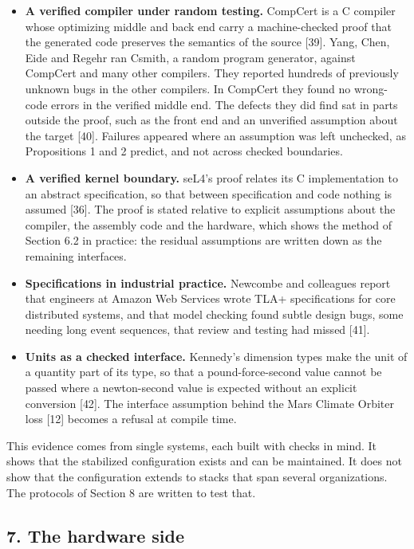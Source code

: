 \documentclass[
  10pt,
]{article}
\providecommand{\tightlist}{%
  \setlength{\itemsep}{0pt}\setlength{\parskip}{0pt}}
\begin{document}
\begin{itemize}
\tightlist
\item
  \textbf{A verified compiler under random testing.} CompCert is a C
  compiler whose optimizing middle and back end carry a machine-checked
  proof that the generated code preserves the semantics of the source
  {[}39{]}. Yang, Chen, Eide and Regehr ran Csmith, a random program
  generator, against CompCert and many other compilers. They reported
  hundreds of previously unknown bugs in the other compilers. In
  CompCert they found no wrong-code errors in the verified middle end.
  The defects they did find sat in parts outside the proof, such as the
  front end and an unverified assumption about the target {[}40{]}.
  Failures appeared where an assumption was left unchecked, as
  Propositions 1 and 2 predict, and not across checked boundaries.
\item
  \textbf{A verified kernel boundary.} seL4's proof relates its C
  implementation to an abstract specification, so that between
  specification and code nothing is assumed {[}36{]}. The proof is
  stated relative to explicit assumptions about the compiler, the
  assembly code and the hardware, which shows the method of Section 6.2
  in practice: the residual assumptions are written down as the
  remaining interfaces.
\item
  \textbf{Specifications in industrial practice.} Newcombe and
  colleagues report that engineers at Amazon Web Services wrote TLA+
  specifications for core distributed systems, and that model checking
  found subtle design bugs, some needing long event sequences, that
  review and testing had missed {[}41{]}.
\item
  \textbf{Units as a checked interface.} Kennedy's dimension types make
  the unit of a quantity part of its type, so that a pound-force-second
  value cannot be passed where a newton-second value is expected without
  an explicit conversion {[}42{]}. The interface assumption behind the
  Mars Climate Orbiter loss {[}12{]} becomes a refusal at compile time.
\end{itemize}

This evidence comes from single systems, each built with checks in mind.
It shows that the stabilized configuration exists and can be maintained.
It does not show that the configuration extends to stacks that span
several organizations. The protocols of Section 8 are written to test
that.

\subsection{7. The hardware side}\label{the-hardware-side}
\end{document}
